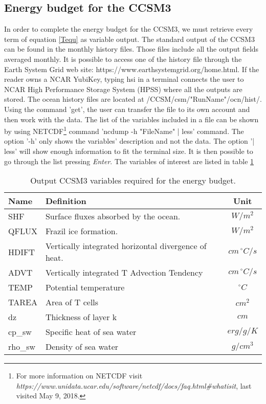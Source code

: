 \subsection{Energy budget for the CCSM3}\label{c3}

In order to complete the energy budget for the CCSM3, we must retrieve every term of equation \ref{Tequ} as variable output. The standard output of the CCSM3 can be found in the monthly history files. Those files include all the output fields averaged monthly. It is possible to access one of the history file through the Earth System Grid web site: https://www.earthsystemgrid.org/home.html. If the reader owns a NCAR YubiKey, typing hsi in a terminal connects the user to NCAR High Performance Storage System (HPSS) where all the outputs are stored. The ocean history files are located at /CCSM/csm/"RunName"/ocn/hist/. Using the command 'get', the user can transfer the file to its own account and then work with the data. The list of the variables included in a file can be shown by using NETCDF\footnote{For more information on NETCDF visit \textit{https://www.unidata.ucar.edu/software/netcdf/docs/faq.html\#whatisit}, last visited May 9, 2018.} command 'ncdump -h "FileName" | less' command. The option '-h' only shows the variables' description and not the data. The option '| less' will show enough information to fit the terminal size. It is then possible to go through the list pressing \textit{Enter}. The variables of interest are listed in table \ref{var3}
\begin{table}
\centering
\begin{tabular}{l | l | c}
\hline
 Name  & Definition & Unit \\
\hline
  SHF  & 	Surface fluxes absorbed by the ocean. 	& $W/m^2$  \\
  QFLUX  &    Frazil ice formation.				& $W/m^2$  \\
  HDIFT  &    Vertically integrated horizontal divergence of heat.	& $cm \, ^\circ C/s$\\
  ADVT & 	Vertically integrated T Advection Tendency & $cm \, ^\circ C/s$ \\
  TEMP   & Potential temperature &   $^\circ C$ \\ 
  TAREA & Area of T cells & $cm^2$ \\
  dz & Thickness of layer k & $cm$ \\
  cp\_sw & Specific heat of sea water & $erg/g/K$\\
  rho\_sw & Density of sea water & $g/cm^3$
\end{tabular}
\caption{Output CCSM3 variables required for the energy budget.} \label{var3}
\end{table}

